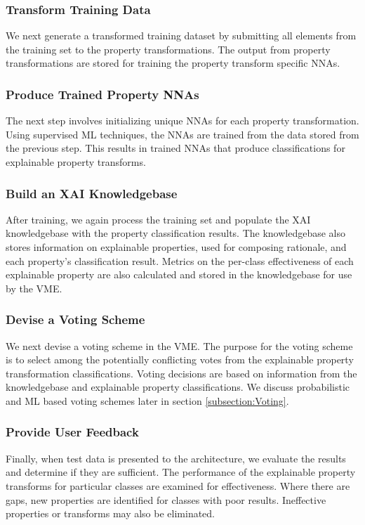 \documentclass[conference]{IEEEtran}
\begin{document}
\subsubsection{Transform Training Data} 
We next generate a transformed training dataset by submitting all elements from the training set to the property transformations.  The output from property transformations are stored for training the property transform specific NNAs. 

\subsubsection{Produce Trained Property NNAs}
The next step involves initializing unique NNAs for each property transformation.  Using supervised ML techniques, the NNAs are trained from the data stored from the previous step.  This results in trained NNAs that produce classifications for explainable property transforms.

\subsubsection{Build an XAI Knowledgebase}
After training, we again process the training set and populate the XAI knowledgebase with the property classification results.  The knowledgebase also stores information on explainable properties, used for composing rationale, and each property's classification result.  Metrics on the per-class effectiveness of each explainable property are also calculated and stored in the knowledgebase for use by the VME.

\subsubsection{Devise a Voting Scheme}
We next devise a voting scheme in the VME.  The purpose for the voting scheme is to select among the potentially conflicting votes from the explainable property transformation classifications.  Voting decisions are based on information from the knowledgebase and explainable property classifications.  We discuss probabilistic and ML based voting schemes later in section \ref{subsection:Voting}.

\subsubsection{Provide User Feedback}
Finally, when test data is presented to the architecture, we evaluate the results and determine if they are sufficient.  The performance of the explainable property transforms for particular classes are examined for effectiveness.  Where there are gaps, new properties are identified for classes with poor results.  Ineffective properties or transforms may also be eliminated.
\end{document}
